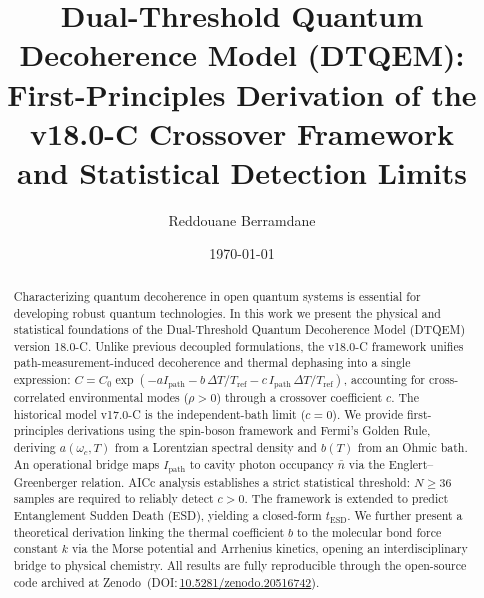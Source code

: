 \documentclass[reprint,amsmath,amssymb,aps,pra,superscriptaddress]{revtex4-2}
\begin{document}
\title{Dual-Threshold Quantum Decoherence Model (DTQEM):\\
First-Principles Derivation of the v18.0-C Crossover Framework\\
and Statistical Detection Limits}
\author{Reddouane Berramdane}
\date{\today}

\begin{abstract}
Characterizing quantum decoherence in open quantum systems is essential for
developing robust quantum technologies. In this work we present the physical
and statistical foundations of the Dual-Threshold Quantum Decoherence Model
(DTQEM) version 18.0-C. Unlike previous decoupled formulations, the v18.0-C
framework unifies path-measurement-induced decoherence and thermal dephasing
into a single expression:
$C = C_0\exp(-a I_{\text{path}} - b\,\Delta T/T_{\text{ref}}
- c\,I_{\text{path}}\,\Delta T/T_{\text{ref}})$,
accounting for cross-correlated environmental modes ($\rho>0$) through a
crossover coefficient $c$. The historical model v17.0-C is the
independent-bath limit ($c=0$). We provide first-principles derivations using
the spin-boson framework and Fermi's Golden Rule, deriving $a(\omega_c,T)$
from a Lorentzian spectral density and $b(T)$ from an Ohmic bath. An
operational bridge maps $I_{\text{path}}$ to cavity photon occupancy $\bar n$
via the Englert--Greenberger relation. AICc analysis establishes a strict
statistical threshold: $N\ge36$ samples are required to reliably detect
$c>0$. The framework is extended to predict Entanglement Sudden Death (ESD),
yielding a closed-form $t_{\text{ESD}}$. We further present a theoretical
derivation linking the thermal coefficient $b$ to the molecular bond force
constant $k$ via the Morse potential and Arrhenius kinetics, opening an
interdisciplinary bridge to physical chemistry. All results are fully
reproducible through the open-source code archived at
Zenodo~(DOI:\,\href{https://doi.org/10.5281/zenodo.20516742}{10.5281/zenodo.20516742}).
\end{abstract}
\maketitle

\end{document}
